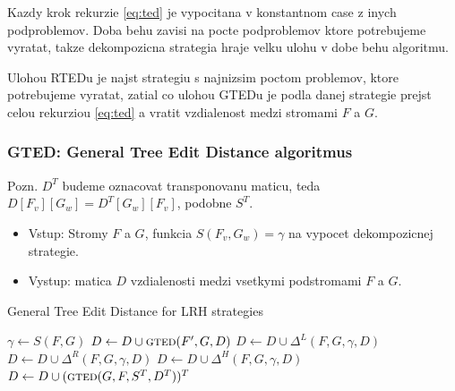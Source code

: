 Kazdy krok rekurzie \ref{eq:ted} je vypocitana v konstantnom case z inych podproblemov.
Doba behu zavisi na pocte podproblemov ktore potrebujeme vyratat, takze dekompozicna
strategia hraje velku ulohu v dobe behu algoritmu.

Ulohou RTEDu je najst strategiu s najnizsim poctom problemov, ktore potrebujeme vyratat,
zatial co ulohou GTEDu je podla danej strategie prejst celou rekurziou \ref{eq:ted} a vratit
vzdialenost medzi stromami $F$ a $G$.




\subsubsection{GTED: General Tree Edit Distance algoritmus}

Pozn. $D^{T}$ budeme oznacovat transponovanu maticu, teda
$D[F_{v}][G_{w}] = D^{T}[G_{w}][F_{v}]$, podobne $S^{T}$.

\begin{itemize}
  \item Vstup: Stromy $F$ a $G$, funkcia $S(F_{v}, G_{w}) = \gamma$
    na vypocet dekompozicnej strategie.
  \item Vystup: matica $D$ vzdialenosti medzi vsetkymi podstromami $F$ a $G$.
\end{itemize}


\begin{algorithm}
  \caption{General Tree Edit Distance for LRH strategies}\label{alg:gted}
  \begin{algorithmic}[1]
      \State {}
      \State {}
      \State $\gamma \gets S(F, G)$
          \State $D \gets D \cup \Call{gted}{F', G, D}$
        \EndFor
          \State $D \gets D \cup \Delta^{L}(F, G, \gamma, D)$
          \State $D \gets D \cup \Delta^{R}(F, G, \gamma, D)$
        \Else
          \State $D \gets D \cup \Delta^{H}(F, G, \gamma, D)$
        \EndIf
      \Else
      \State $D \gets D \cup (\Call{gted}{G, F, S^{T}, D^{T}})^{T}$
      \EndIf
      \State {}
    \EndProcedure
  \end{algorithmic}
\end{algorithm}

